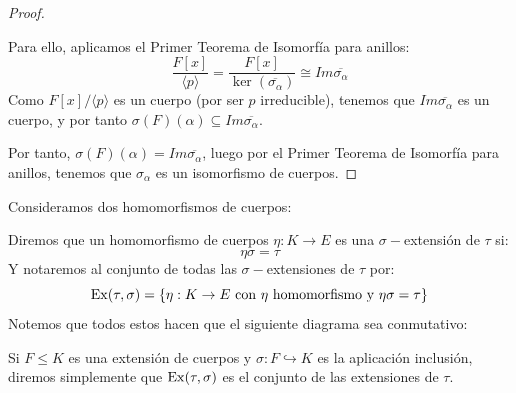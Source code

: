 \begin{lema}
\begin{proof}
\begin{description}
            Para ello, aplicamos el Primer Teorema de Isomorfía para anillos:
            \begin{equation*}
                \dfrac{F[x]}{\langle p \rangle } = \dfrac{F[x]}{\ker(\overline{\sigma_\alpha})} \cong Im \overline{\sigma_\alpha}
            \end{equation*}
            Como $F[x]/\langle p \rangle$ es un cuerpo (por ser $p$ irreducible), tenemos que $Im \overline{\sigma_\alpha}$ es un cuerpo, y por tanto $\sigma(F)(\alpha)\subseteq Im\overline{\sigma_\alpha}$.
        \end{description}

        Por tanto, $\sigma(F)(\alpha) = Im\overline{\sigma_\alpha}$, luego por el Primer Teorema de Isomorfía para anillos, tenemos que $\sigma_\alpha$ es un isomorfismo de cuerpos.
    \end{proof}
\end{lema}

\begin{definicion}
    Consideramos dos homomorfismos de cuerpos:
    \begin{figure}[H]
        \centering
    \end{figure}
    \noindent
    Diremos que un homomorfismo de cuerpos $\eta:K\to E$ es una $\sigma-$extensión de $\tau$ si:
    \begin{equation*}
        \eta\sigma = \tau
    \end{equation*}
    \noindent
    Y notaremos al conjunto de todas las $\sigma-$extensiones de $\tau$ por:
    \begin{equation*}
        \operatorname{Ex}(\tau,\sigma) = \{\eta:K\to E \text{\ con\ } \eta \text{\ homomorfismo y\ } \eta \sigma = \tau\}
    \end{equation*}
    Notemos que todos estos hacen que el siguiente diagrama sea conmutativo:
    \begin{figure}[H]
        \centering
    \end{figure}
    \noindent
    Si $F\leq K$ es una extensión de cuerpos y $\sigma:F\hookrightarrow K$ es la aplicación inclusión, diremos simplemente que $\operatorname{Ex}(\tau,\sigma)$ es el conjunto de las extensiones de $\tau$.
\end{definicion}

